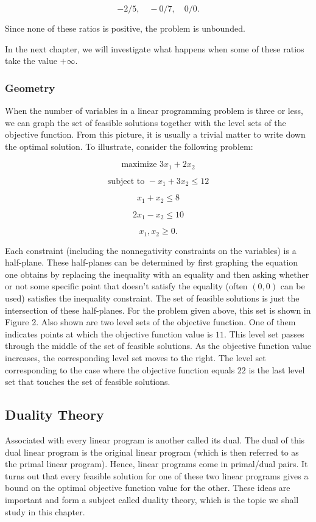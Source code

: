 \documentclass{article}
\begin{document}
    \[
    -2/5, \quad -0/7, \quad 0/0.
    \]
    
    Since none of these ratios is positive, the problem is unbounded.
    
    In the next chapter, we will investigate what happens when some of these ratios take the value \( +\infty \).
    
    \subsubsection{Geometry}
    
    When the number of variables in a linear programming problem is three or less, we can graph the set of feasible solutions together with the level sets of the objective function. From this picture, it is usually a trivial matter to write down the optimal solution. To illustrate, consider the following problem:
    
    \[
    \text{maximize } 3x_{1} + 2x_{2}
    \]
    
    \[
    \text{subject to } -x_{1} + 3x_{2} \leq 12
    \]
    
    \[
    x_{1} + x_{2} \leq 8
    \]
    
    \[
    2x_{1} - x_{2} \leq 10
    \]
    
    \[
    x_{1}, x_{2} \geq 0.
    \]
    
    Each constraint (including the nonnegativity constraints on the variables) is a half-plane. These half-planes can be determined by first graphing the equation one obtains by replacing the inequality with an equality and then asking whether or not some specific point that doesn't satisfy the equality (often \( (0,0) \) can be used) satisfies the inequality constraint. The set of feasible solutions is just the intersection of these half-planes. For the problem given above, this set is shown in Figure 2. Also shown are two level sets of the objective function. One of them indicates points at which the objective function value is \( 11 \). This level set passes through the middle of the set of feasible solutions. As the objective function value increases, the corresponding level set moves to the right. The level set corresponding to the case where the objective function equals \( 22 \) is the last level set that touches the set of feasible solutions.
\subsection{Duality Theory}
Associated with every linear program is another called its dual. The dual of this dual linear program is the original linear program (which is then referred to as the primal linear program). Hence, linear programs come in primal/dual pairs. It turns out that every feasible solution for one of these two linear programs gives a bound on the optimal objective function value for the other. These ideas are important and form a subject called duality theory, which is the topic we shall study in this chapter.
\end{document}
